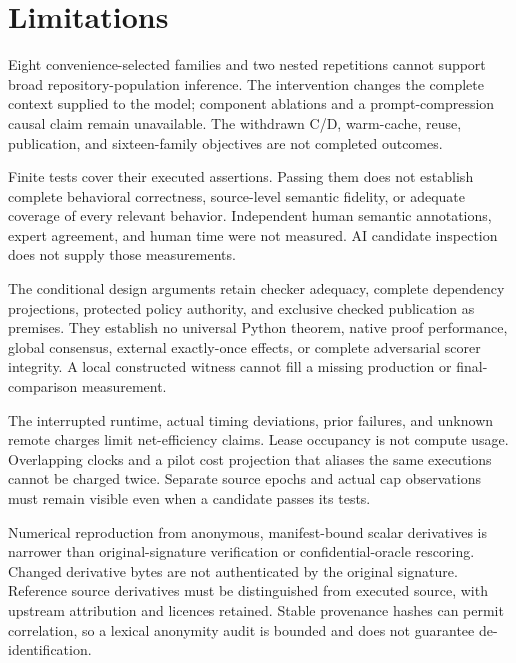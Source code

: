\section{Limitations}
\label{sec:limitations}

Eight convenience-selected families and two nested repetitions cannot support
broad repository-population inference. The intervention changes the complete
context supplied to the model; component ablations and a prompt-compression
causal claim remain unavailable. The withdrawn C/D, warm-cache, reuse,
publication, and sixteen-family objectives are not completed outcomes.

Finite tests cover their executed assertions. Passing them does not establish
complete behavioral correctness, source-level semantic fidelity, or adequate
coverage of every relevant behavior. Independent human semantic annotations,
expert agreement, and human time were not measured. AI candidate inspection
does not supply those measurements.

The conditional design arguments retain checker adequacy, complete dependency
projections, protected policy authority, and exclusive checked publication as
premises. They establish no universal Python theorem, native proof performance,
global consensus, external exactly-once effects, or complete adversarial scorer
integrity. A local constructed witness cannot fill a missing production or
final-comparison measurement.

The interrupted runtime, actual timing deviations, prior failures, and unknown
remote charges limit net-efficiency claims. Lease occupancy is not compute
usage. Overlapping clocks and a pilot cost projection that aliases the same
executions cannot be charged twice. Separate source epochs and actual cap
observations must remain visible even when a candidate passes its tests.

Numerical reproduction from anonymous, manifest-bound scalar derivatives is
narrower than original-signature verification or confidential-oracle rescoring.
Changed derivative bytes are not authenticated by the original signature.
Reference source derivatives must be distinguished from executed source, with
upstream attribution and licences retained. Stable provenance hashes can permit
correlation, so a lexical anonymity audit is bounded and does not guarantee
de-identification.

